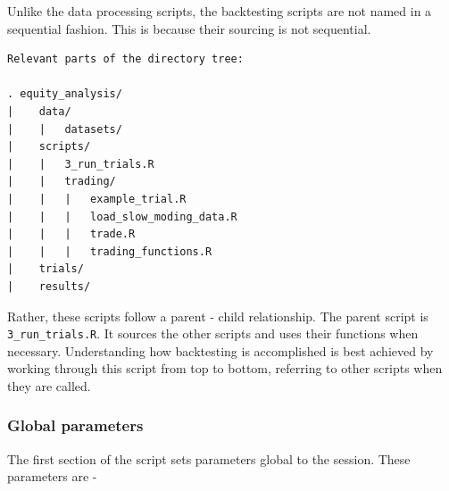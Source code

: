 \documentclass[11pt,preprint, authoryear]{elsarticle}
\numberwithin{equation}{section}
\numberwithin{figure}{section}
\numberwithin{table}{section}
\begin{document}
Unlike the data processing scripts, the backtesting scripts are not
named in a sequential fashion. This is because their sourcing is not
sequential.

\begin{verbatim}
Relevant parts of the directory tree: 

. equity_analysis/
|    data/
|    |   datasets/
|    scripts/
|    |   3_run_trials.R
|    |   trading/
|    |   |   example_trial.R
|    |   |   load_slow_moding_data.R
|    |   |   trade.R
|    |   |   trading_functions.R
|    trials/
|    results/
\end{verbatim}

Rather, these scripts follow a parent - child relationship. The parent
script is \texttt{3\_run\_trials.R}. It sources the other scripts and
uses their functions when necessary. Understanding how backtesting is
accomplished is best achieved by working through this script from top to
bottom, referring to other scripts when they are called.

\subsubsection{Global parameters}\label{global-parameters}

The first section of the script sets parameters global to the session.
These parameters are -
\end{document}
